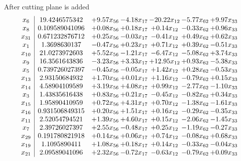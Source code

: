 \documentclass[8pt]{article}
\begin{document}
 After cutting plane is added 
\[\begin{array}{c| c c@{\hskip 2pt} c@{\hskip 2pt} c@{\hskip 2pt} c@{\hskip 2pt} c@{\hskip 2pt} }
 x_{6}   &  19.4246575342 & +  9.57 x_{56} & -4.18 x_{17} & -20.22 x_{12} & -5.77 x_{62} & +  9.97 x_{33}\\
 x_{8}   &  0.109589041096 & +  0.08 x_{56} & +  0.18 x_{17} & +  0.14 x_{12} & -0.33 x_{62} & +  0.96 x_{33}\\
 x_{31}   &  0.671232876712 & +  0.25 x_{56} & -0.03 x_{17} & -0.41 x_{12} & +  0.49 x_{62} & +  0.62 x_{33}\\
 x_{1}   &  1.3698630137 & -0.47 x_{56} & +  0.23 x_{17} & +  0.71 x_{12} & +  0.39 x_{62} & -0.51 x_{33}\\
 x_{10}   &  21.0273972603 & +  5.52 x_{56} & -1.21 x_{17} & -6.47 x_{12} & -5.08 x_{62} & +  3.74 x_{33}\\
 x_{9}   &  16.3561643836 & -3.23 x_{56} & +  3.33 x_{17} & + 12.95 x_{12} & +  0.93 x_{62} & -5.38 x_{33}\\
 x_{5}   &  0.739726027397 & -0.45 x_{56} & -0.05 x_{17} & +  1.42 x_{12} & +  0.28 x_{62} & -0.53 x_{33}\\
 x_{13}   &  2.93150684932 & +  1.70 x_{56} & +  0.01 x_{17} & +  1.16 x_{12} & -0.79 x_{62} & +  0.15 x_{33}\\
 x_{14}   &  4.58904109589 & +  3.19 x_{56} & +  4.08 x_{17} & +  0.99 x_{12} & -2.77 x_{62} & -1.10 x_{33}\\
 x_{3}   &  1.43835616438 & +  0.83 x_{56} & +  0.21 x_{17} & -0.45 x_{12} & -0.82 x_{62} & +  0.34 x_{33}\\
 x_{15}   &  1.95890410959 & +  0.72 x_{56} & +  4.31 x_{17} & +  0.70 x_{12} & -1.38 x_{62} & -1.61 x_{33}\\
 x_{16}   &  0.931506849315 & +  0.20 x_{56} & +  1.51 x_{17} & +  0.16 x_{12} & -0.29 x_{62} & -0.35 x_{33}\\
 x_{11}   &  2.52054794521 & +  1.39 x_{56} & +  4.60 x_{17} & +  0.15 x_{12} & -2.06 x_{62} & -1.45 x_{33}\\
 x_{7}   &  2.39726027397 & +  2.55 x_{56} & -0.48 x_{17} & +  0.25 x_{12} & -1.19 x_{62} & -0.27 x_{33}\\
 x_{29}   &  0.191780821918 & +  0.14 x_{56} & +  0.06 x_{17} & +  0.74 x_{12} & -0.08 x_{62} & +  0.68 x_{33}\\
 x_{19}   &  1.1095890411 & +  1.08 x_{56} & +  0.18 x_{17} & +  0.14 x_{12} & -0.33 x_{62} & -0.04 x_{33}\\
 x_{21}   &  2.09589041096 & +  2.32 x_{56} & -0.72 x_{17} & -0.63 x_{12} & -0.79 x_{62} & +  0.09 x_{33}\\

\end{array}\]
\end{document}
